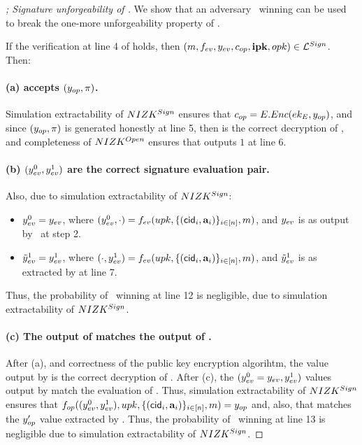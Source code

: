 \begin{proof}[; Signature unforgeability of \CUASGen]
  We show that an adversary \adv~winning \ExpForgeSign can be used to break the
  one-more unforgeability property of \SBCM.
 
  If the verification at line 4 of \ExpForgeSign holds, then $(m,f_{ev},
  y_{ev},c_{op},\mathbf{ipk},opk) \in \mathcal{L}^{Sign}$. Then:

  \paragraph{(a) \Judge accepts $(y_{op},\pi)$.} %
  Simulation extractability of $NIZK^{Sign}$ ensures that $c_{op} =
  E.Enc(ek_{E},y_{op})$, and since $(y_{op},\pi)$ is generated honestly at
  line 5, then \yinsp is the correct decryption of \cinsp, and completeness of
  $NIZK^{Open}$ ensures that \Judge outputs $1$ at line 6.

  \paragraph{(b) $(y_{ev}^0,y_{ev}^1)$ are the correct signature evaluation
    pair.} Also, due to simulation extractability of $NIZK^{Sign}$:

  \begin{itemize}
  \item $y_{ev}^0 = y_{ev}$, where $(y_{ev}^0,\cdot) = f_{ev}(upk,\lbrace
    (\mathsf{cid}_i,\mathbf{a}_i) \rbrace_{i\in[n]},m)$, and $y_{ev}$ is as output by
    \adv~at step 2.    
  \item $\tilde{y}_{ev}^1 = y_{ev}^1$, where $(\cdot,y_{ev}^1) = f_{ev}(upk,\lbrace
    (\mathsf{cid}_i,\mathbf{a}_i)\rbrace_{i\in[n]},m)$, and $\tilde{y}_{ev}^1$ is as extracted
    by \ExtractSign at line 7.
  \end{itemize}

  Thus, the probability of \adv~winning at line 12 is negligible, due to
  simulation extractability of $NIZK^{Sign}$.

  \paragraph{(c) The output of \finsp matches the output of \Open.} %
  After (a), and correctness of the public key encryption algorihtm, the \yinsp
  value output by \Open is the correct decryption of
  \cinsp. After (c), the $(y_{ev}^0=y_{ev},y_{ev}^1)$ values output by
  \ExtractSign match the evaluation of \feval. Thus, simulation extractability
  of $NIZK^{Sign}$ ensures that $f_{op}((y_{ev}^0,y_{ev}^1),upk,\lbrace
  (\mathsf{cid}_i,\mathbf{a}_i)\rbrace_{i\in[n]},m) = y_{op}$ and, also, that \yinsp
  matches the $y_{op}'$ value extracted by \ExtractSign. Thus, the probability
  of \adv~winning at line 13 is negligible due to simulation extractability
  of $NIZK^{Sign}$.


\end{proof}
